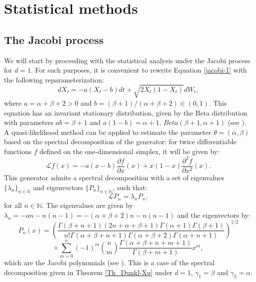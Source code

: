\documentclass[12pt]{article}
\begin{document}
\section{Statistical methods}\label{sec:stat-meth}


\subsection{The Jacobi process}\label{sec:stat-jac}

We will start by proceeding with the statistical analysis under the Jacobi process for $d=1$. For such purposes, it is convenient to rewrite Equation \eqref{jacobi-1} with the following reparameterization:
\begin{equation}\label{eq:jacobi-repar}
dX_t=-a(X_t-b)dt+\sqrt{2X_t(1-X_t)}dW_t,
\end{equation}
where $a=\alpha+\beta+2>0$ and $b=(\beta+1)/(\alpha+\beta+2)\in(0,1)$. This equation has an invariant stationary distribution,  given by the Beta distribution with parameters $ab=\beta+1$ and $a(1-b)=\alpha+1$, $Beta(\beta+1,\alpha+1)$ (see \citep{gourieroux2006multivariate}).
A quasi-likelihood method can be applied to estimate the parameter $\theta=(\alpha,\beta)$ based on the spectral decomposition of the  generator: for twice differentiable functions $f$ defined on the one-dimensional simplex, it will be given by:
\begin{equation}\label{generator-repar}
\mathcal{L}f(x)=-a(x-b)\frac{\partial f}{\partial x}(x)+x(1-x)\frac{\partial^2 f}{\partial x^2}(x).    
\end{equation}
This generator admits a spectral decomposition with a set of eigenvalues $\{\lambda_n\}_{n\in\mathbb{N}}$ and eigenvectors $\{P_n\}_{n\in\mathbb{N}}$, such that:
\begin{equation}\label{eq:spectral}
\mathcal{L}P_n=\lambda_nP_n,
\end{equation}
for all $n\in\mathbb{N}$. The eigenvalues are given by $\lambda_n=-an-n(n-1)=-(\alpha+\beta+2)n-n(n-1)$ and the eigenvectors by:
\[
P_n(x)=\left(\frac{\Gamma(\beta+n+1)(2n+\alpha+\beta+1)\Gamma(\alpha+1)\Gamma(\beta+1)}{n!\Gamma(\alpha+\beta+n+1)\Gamma(\alpha+\beta+2)\Gamma(\alpha+n+1)}\right)^{1/2}
\]
\begin{equation}\label{eigenfunctions}
\times\sum_{m=0}^{n}(-1)^{m}\binom{n}{m}\frac{\Gamma(\alpha+\beta+n+m+1)}{\Gamma(\beta+m+1)}x^m,
\end{equation}
which are the Jacobi polynomials (see \cite{wong1964construction}). This is a case of the spectral decomposition given in  Theorem \ref{Th_Dunkl-Xu} under $d=1$, $\gamma_1=\beta$ and $\gamma_2=\alpha$.
\end{document}
